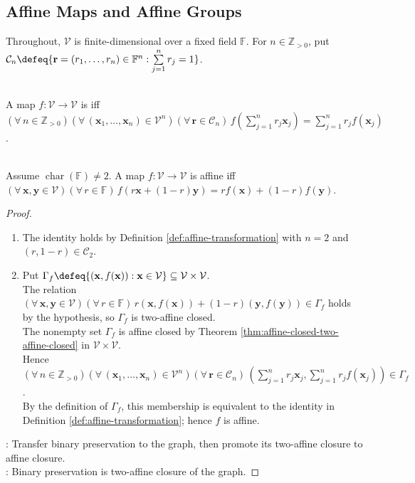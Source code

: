 \subsection{Affine Maps and Affine Groups}

Throughout, $\mathcal{V}$ is finite-dimensional over a fixed field $\mathbb{F}$. For $n\in\mathbb{Z}_{>0}$, put $\mathcal{C}_n\defeq\{\mathbf{r}=(r_1,\ldots,r_n)\in\mathbb{F}^n:\sum\limits_{j=1}^n r_j=1\}$.

\begin{definition} \label{def:affine-transformation} \\
A map $f:\mathcal{V}\to\mathcal{V}$ is  iff $(\forall\,n\in\mathbb{Z}_{>0})(\forall\,(\mathbf{x}_1,\ldots,\mathbf{x}_n)\in\mathcal{V}^n)(\forall\,\mathbf{r}\in\mathcal{C}_n)\,f(\sum\limits_{j=1}^n r_j\mathbf{x}_j)=\sum\limits_{j=1}^n r_jf(\mathbf{x}_j)$.
\end{definition}

\begin{theorem} \label{thm:affine-map-two-point-test} \\
Assume $\operatorname{char}(\mathbb{F})\neq2$. A map $f:\mathcal{V}\to\mathcal{V}$ is affine iff $(\forall\,\mathbf{x},\mathbf{y}\in\mathcal{V})(\forall\,r\in\mathbb{F})\,f(r\mathbf{x}+(1-r)\mathbf{y})=rf(\mathbf{x})+(1-r)f(\mathbf{y})$.
\begin{proof}
\begin{enumerate}[label=\roman*.]
\setlength{\itemsep}{0pt}
\item[$(\Rightarrow)$] The identity holds by Definition \ref{def:affine-transformation} with $n=2$ and $(r,1-r)\in\mathcal{C}_2$.
\item[$(\Leftarrow)$] Put $\Gamma_f\defeq\{(\mathbf{x},f(\mathbf{x})):\mathbf{x}\in\mathcal{V}\}\subseteq\mathcal{V}\times\mathcal{V}$.\\
The relation $(\forall\,\mathbf{x},\mathbf{y}\in\mathcal{V})(\forall\,r\in\mathbb{F})\,r(\mathbf{x},f(\mathbf{x}))+(1-r)(\mathbf{y},f(\mathbf{y}))\in\Gamma_f$ holds by the hypothesis, so $\Gamma_f$ is two-affine closed.\\
The nonempty set $\Gamma_f$ is affine closed by Theorem \ref{thm:affine-closed-two-affine-closed} in $\mathcal{V}\times\mathcal{V}$.\\
Hence $(\forall\,n\in\mathbb{Z}_{>0})(\forall\,(\mathbf{x}_1,\ldots,\mathbf{x}_n)\in\mathcal{V}^n)(\forall\,\mathbf{r}\in\mathcal{C}_n)\,(\sum\limits_{j=1}^n r_j\mathbf{x}_j,\sum\limits_{j=1}^n r_jf(\mathbf{x}_j))\in\Gamma_f$.\\
By the definition of $\Gamma_f$, this membership is equivalent to the identity in Definition \ref{def:affine-transformation}; hence $f$ is affine.
\end{enumerate}
: Transfer binary preservation to the graph, then promote its two-affine closure to affine closure.\\
: Binary preservation is two-affine closure of the graph.
\end{proof}
\end{theorem}

